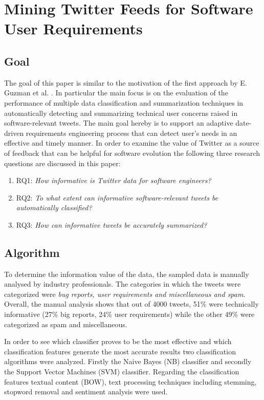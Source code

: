 \documentclass[a4paper,10pt, bibliography=totocnumbered]{scrreprt}
\begin{document}
\chapter{Mining Twitter Feeds for Software User Requirements}
\label{chap:4}

\section{Goal}
The goal of this paper is similar to the motivation of the first approach by E. Guzman et al. \cite{Guzman}. In particular the main focus is on the evaluation of the performance of multiple data classification and summarization techniques in automatically detecting and summarizing technical user concerns raised in software-relevant tweets. The main goal hereby is to support an adaptive date-driven requirements engineering process that can detect user's needs in an effective and timely manner. In order to examine the value of Twitter as a source of feedback that can be helpful for software evolution the following three research questions are discussed in this paper: 

\begin{enumerate}
    \item RQ1: \textit{How informative is Twitter data for software engineers?}
    \item RQ2: \textit{To what extent can informative software-relevant tweets be automatically classified?}
    \item RQ3: \textit{How can informative tweets be accurately summarized?}
\end{enumerate}

\section{Algorithm}
To determine the information value of the data, the sampled data is manually analysed by industry professionals. The categories in which the tweets were categorized were \textit{bug reports, user requirements and miscellaneous and spam}. Overall, the manual analysis shows that out of 4000 tweets, 51\% were technically informative (27\% big reports, 24\% user requirements) while the other 49\% were categorized as spam and miscellaneous. 

In order to see which classifier proves to be the most effective and which classification features generate the most accurate results two classification algorithms were analyzed. Firstly the Naive Bayes (NB) classifier and secondly the Support Vector Machines (SVM) classifier. Regarding the classification features textual content (BOW), text processing techniques including stemming, stopword removal and sentiment analysis were used.
\end{document}
